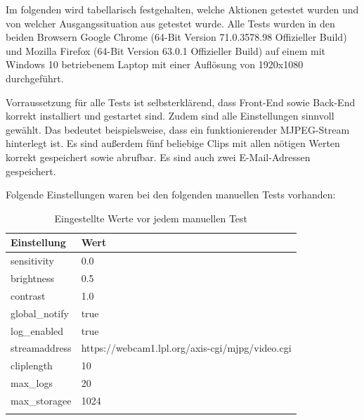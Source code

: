Im folgenden wird tabellarisch festgehalten, welche Aktionen getestet wurden und von welcher Ausgangssituation aus getestet wurde. Alle Tests wurden in den beiden Browsern Google Chrome (64-Bit Version 71.0.3578.98 Offizieller Build) und Mozilla Firefox (64-Bit Version 63.0.1 Offizieller Build) auf einem mit Windows 10 betriebenem Laptop mit einer Auflösung von 1920x1080 durchgeführt.

\vspace{0.5cm}

Vorraussetzung für alle Tests ist selbsterklärend, dass Front-End sowie Back-End korrekt installiert und gestartet sind. Zudem sind alle Einstellungen sinnvoll gewählt. Das bedeutet beispielsweise, dass ein funktionierender MJPEG-Stream hinterlegt ist. Es sind außerdem fünf beliebige Clips mit allen nötigen Werten korrekt gespeichert sowie abrufbar. Es sind auch zwei E-Mail-Adressen gespeichert.

\vspace{0.5cm}

Folgende Einstellungen waren bei den folgenden manuellen Tests vorhanden:

\begin{longtable}{| p{} | p{} |}
	\hline
	\textbf{Einstellung} & \textbf{Wert} \\ \hline

	sensitivity & 0.0 \\ \hline
		
	brightness & 0.5 \\ \hline
		
	contrast & 1.0 \\ \hline
		
	global\_notify & true \\ \hline
		
	log\_enabled & true \\ \hline
		
	streamaddress & https://webcam1.lpl.org/axis-cgi/mjpg/video.cgi \\ \hline
		
	cliplength & 10 \\ \hline
		
	max\_logs & 20 \\ \hline
		
	max\_storagee & 1024 \\ \hline
	
\caption{Eingestellte Werte vor jedem manuellen Test}
\label{tab:eingestellte_werte_vor_tests}
\end{longtable}

